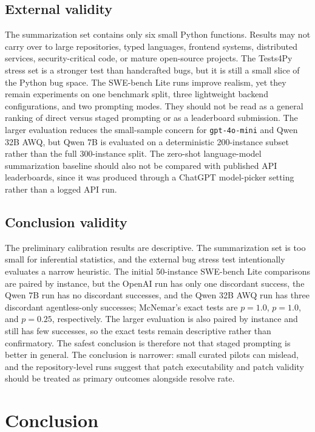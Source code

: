 \documentclass[preprint,12pt]{elsarticle}
\begin{document}
\subsection{External validity}

The summarization set contains only six small Python functions. Results may not carry over to large repositories, typed languages, frontend systems, distributed services, security-critical code, or mature open-source projects. The Tests4Py stress set is a stronger test than handcrafted bugs, but it is still a small slice of the Python bug space. The SWE-bench Lite runs improve realism, yet they remain experiments on one benchmark split, three lightweight backend configurations, and two prompting modes. They should not be read as a general ranking of direct versus staged prompting or as a leaderboard submission. The larger evaluation reduces the small-sample concern for \texttt{gpt-4o-mini} and Qwen 32B AWQ, but Qwen 7B is evaluated on a deterministic 200-instance subset rather than the full 300-instance split. The zero-shot language-model summarization baseline should also not be compared with published API leaderboards, since it was produced through a ChatGPT model-picker setting rather than a logged API run.

\subsection{Conclusion validity}

The preliminary calibration results are descriptive. The summarization set is too small for inferential statistics, and the external bug stress test intentionally evaluates a narrow heuristic. The initial 50-instance SWE-bench Lite comparisons are paired by instance, but the OpenAI run has only one discordant success, the Qwen 7B run has no discordant successes, and the Qwen 32B AWQ run has three discordant agentless-only successes; McNemar's exact tests are $p = 1.0$, $p = 1.0$, and $p = 0.25$, respectively. The larger evaluation is also paired by instance and still has few successes, so the exact tests remain descriptive rather than confirmatory. The safest conclusion is therefore not that staged prompting is better in general. The conclusion is narrower: small curated pilots can mislead, and the repository-level runs suggest that patch executability and patch validity should be treated as primary outcomes alongside resolve rate.

\section{Conclusion}
\end{document}
